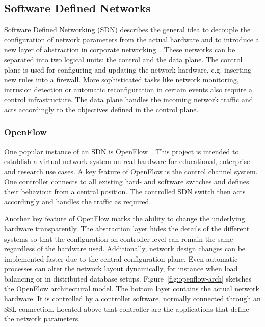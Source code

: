 \documentclass[a4paper,
		12pt,
		parskip=full,
		titlepage
		]{scrartcl}
\begin{document}
\subsection{Software Defined Networks}
\label{sec:SDN}
Software Defined Networking (SDN) describes the general idea to decouple 
the configuration of network parameters from the actual hardware and to 
introduce a new layer of abstraction in corporate networking~\cite{onf_whitepaper}.
These networks can be separated into two logical units: the control and the data plane.
The control plane is used for configuring and updating the network hardware, e.g. inserting new rules into a firewall.
More sophisticated tasks like network monitoring, intrusion detection or 
automatic reconfiguration in certain events also require a control infrastructure.
The data plane handles the incoming network traffic and acts accordingly to the objectives defined in the control plane.

\subsubsection{OpenFlow}
One popular instance of an SDN is OpenFlow~\cite{openflow_spec10}.
This project is intended to establish a virtual network system on real hardware 
for educational, enterprise and research use cases.
A key feature of OpenFlow is the control channel system.
One controller connects to all existing hard- and software switches and defines their behaviour from a central position.
The controlled SDN switch then acts accordingly and handles the traffic as required.

Another key feature of OpenFlow marks the ability to change the underlying hardware transparently.
The abstraction layer hides the details of the different systems so that 
the configuration on controller level can remain the same regardless of the hardware used.
Additionally, network design changes can be implemented faster due to the central configuration plane.
Even automatic processes can alter the network layout dynamically, for instance when load balancing 
or in distributed database setups.
Figure~\ref{fig:openflow-arch} sketches the OpenFlow architectural model.
The bottom layer contains the actual network hardware.
It is controlled by a controller software, normally connected through an SSL connection.
Located above that controller are the applications that define the network parameters.
\end{document}
